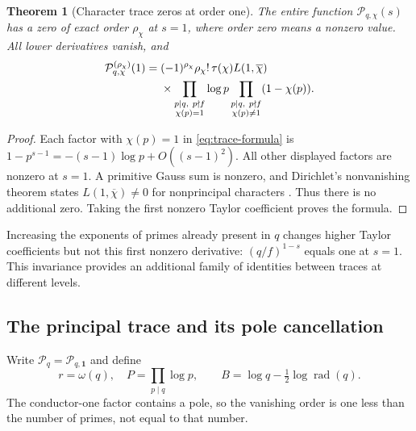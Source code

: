 \documentclass[11pt]{article}
\numberwithin{equation}{section}
\newtheorem{theorem}{Theorem}[section]
\theoremstyle{definition}
\theoremstyle{remark}
\DeclareMathOperator{\rad}{rad}
\newcommand{\cP}{\mathcal P}
\begin{document}
\begin{theorem}[Character trace zeros at order one]\label{thm:trace-zero}
The entire function $\cP_{q,\chi}(s)$ has a zero of exact order
$\rho_\chi$ at $s=1$, where order zero means a nonzero value.
All lower derivatives vanish, and
\begin{align}\label{eq:trace-leading}
 \cP_{q,\chi}^{(\rho_\chi)}(1)
 ={}&(-1)^{\rho_\chi}\rho_\chi!\,
 \tau(\chi)L(1,\overline\chi)\notag\\
 &\times\prod_{\substack{p\mid q,\ p\nmid f\\\chi(p)=1}}\log p
 \prod_{\substack{p\mid q,\ p\nmid f\\\chi(p)\ne1}}(1-\chi(p)).
\end{align}
\end{theorem}
\begin{proof}
Each factor with $\chi(p)=1$ in \eqref{eq:trace-formula} is
$1-p^{s-1}=-(s-1)\log p+O((s-1)^2)$.
All other displayed factors are nonzero at $s=1$.
A primitive Gauss sum is nonzero, and Dirichlet's nonvanishing theorem
states $L(1,\overline\chi)\ne0$ for nonprincipal characters
\cite[Eq.~25.15.9]{dlmf-dirichlet}. Thus there is no additional zero.
Taking the first nonzero Taylor coefficient proves the formula.
\end{proof}

Increasing the exponents of primes already present in $q$ changes
higher Taylor coefficients but not this first nonzero derivative:
$(q/f)^{1-s}$ equals one at $s=1$. This invariance provides an
additional family of identities between traces at different levels.

\subsection{The principal trace and its pole cancellation}
Write $\cP_q=\cP_{q,\mathbf1}$ and define
\[
 r=\omega(q),\quad P=\prod_{p\mid q}\log p,\qquad
 B=\log q-\tfrac12\log\rad(q).
\]
The conductor-one factor contains a pole, so the vanishing order is
one less than the number of primes, not equal to that number.
\end{document}

